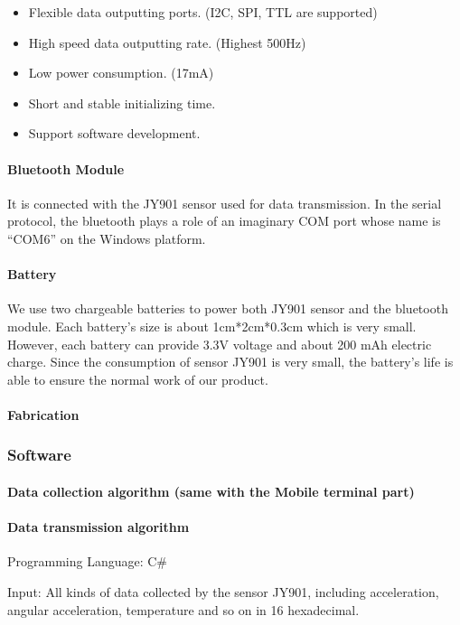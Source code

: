 \begin{itemize}
\item Flexible data outputting ports. (I2C, SPI, TTL are supported)
\item High speed data outputting rate. (Highest 500Hz)
\item Low power consumption. (17mA)
\item Short and stable initializing time. 
\item Support software development. 
\end{itemize}
\paragraph{Bluetooth Module}

It is connected with the JY901 sensor used for data transmission. In the serial
protocol, the bluetooth plays a role of an imaginary COM port whose name is
“COM6” on the Windows platform. 


\paragraph{Battery}

We use two chargeable batteries to power both JY901 sensor and the bluetooth
module. Each battery’s size is about 1cm*2cm*0.3cm which is very small. However,
each battery can provide 3.3V voltage and about 200 mAh electric charge. Since
the consumption of sensor JY901 is very small, the battery’s life is able to
ensure the normal work of our product. 


\paragraph{Fabrication}
\subsubsection{Software}
\paragraph{Data collection algorithm (same with the Mobile terminal part)}
\paragraph{Data transmission algorithm}

Programming Language: C\#

Input: All kinds of data collected by the sensor JY901, including acceleration,
angular acceleration, temperature and so on in 16 hexadecimal.   

